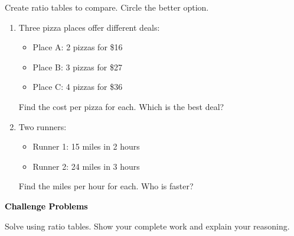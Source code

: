 \documentclass[12pt, letterpaper, fleqn]{article}
\begin{document}
\noindent
Create ratio tables to compare. Circle the better option.

\vspace{3mm}

\begin{enumerate}[itemsep=2.3cm, leftmargin=0.6cm]

\item Three pizza places offer different deals:
\begin{itemize}
    \item Place A: 2 pizzas for \$16
    \item Place B: 3 pizzas for \$27
    \item Place C: 4 pizzas for \$36
\end{itemize}

Find the cost per pizza for each. Which is the best deal?

\vspace{2.5cm}

\item Two runners:
\begin{itemize}
    \item Runner 1: 15 miles in 2 hours
    \item Runner 2: 24 miles in 3 hours
\end{itemize}

Find the miles per hour for each. Who is faster?

\vspace{2.5cm}

\end{enumerate}

\newpage

\begin{tcolorbox}[colback=customteal!20]
\large\textcolor{black}{\textbf{Challenge Problems}}
\end{tcolorbox}

\noindent
Solve using ratio tables. Show your complete work and explain your reasoning.

\vspace{3mm}
\end{document}
